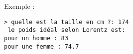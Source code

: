 \documentclass[a4paper]{article}
\begin{document}
\begin{enumerate}
Exemple :
\begin{verbatim}
> quelle est la taille en cm ?: 174
 le poids idéal selon Lorentz est:
pour un homme : 83
pour une femme : 74.7
\end{verbatim}
%
%
\end{enumerate}

\end{document}
